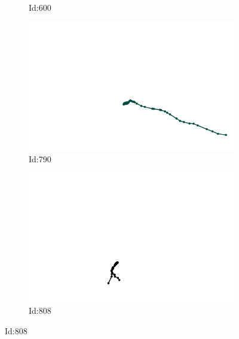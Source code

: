 \documentclass[12pt,twoside]{report}
\begin{document}
\begin{figure}
\begin{subfigure}[b]{0.20\textwidth}
\caption{Id:600}
\end{subfigure}
\begin{subfigure}[b]{0.20\textwidth}
\centering
\includegraphics[width=\textwidth]{../../trajectories/790.png}
\caption{Id:790}
\end{subfigure}
\begin{subfigure}[b]{0.20\textwidth}
\centering
\includegraphics[width=\textwidth]{../../trajectories/808.png}
\caption{Id:808}
\end{subfigure}
\end{figure}
\end{document}
